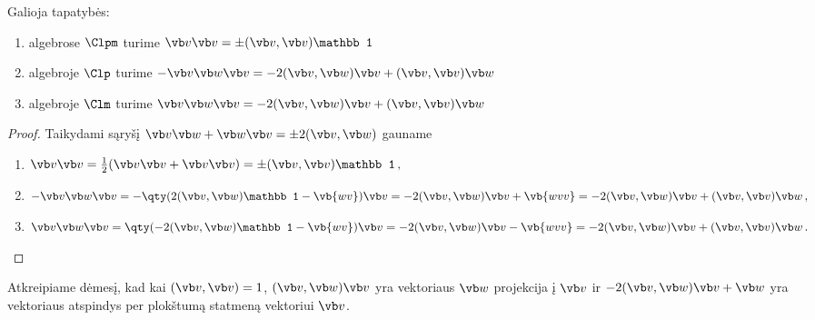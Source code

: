 \begin{proposition}
	\label{prop:R_action}
	Galioja tapatybės:
	\begin{enumerate}
		\item[$(i)$] algebrose $\Clpm$ turime $ \vb v \vb v = \pm(\vb v,\vb v) \mathbb 1$
		\item[$(ii)$] algebroje $\Clp$ turime $ -\vb v \vb w \vb v = -2(\vb v,\vb w) \vb v + (\vb v,\vb v)\vb w $
		\item[$(iii)$] algebroje $\Clm$ turime $ \vb v \vb w \vb v = -2(\vb v,\vb w) \vb v + (\vb v,\vb v)\vb w $
	\end{enumerate}
\end{proposition}
\begin{proof} Taikydami sąryšį $\vb v \vb w + \vb w \vb v = \pm2(\vb v ,\vb w)$ gauname
	\begin{enumerate}
		\item[$(i)$] 
			$
			\vb v \vb v 
			= \frac{1}{2}(\vb v \vb v + \vb v \vb v) 
			= \pm(\vb v,\vb v) \mathbb 1
			\,,
			$
		\item[$(ii)$] 	
			$
			-\vb v \vb w \vb v 
			= -\qty( 2(\vb v,\vb w)\mathbb 1 - \vb{wv} )\vb v 
			= -2(\vb v,\vb w) \vb v + \vb{wvv} 
			= -2(\vb v,\vb w) \vb v + (\vb v,\vb v)\vb w 
			\,,
			$
		\item[$(iii)$]
			$
			\vb v \vb w \vb v 
			= \qty( - 2(\vb v,\vb w)\mathbb 1 - \vb{wv} )\vb v 
			= -2(\vb v,\vb w) \vb v - \vb{wvv} 
			= -2(\vb v,\vb w) \vb v + (\vb v,\vb v)\vb w 
			\,.
			$
			\qedhere
	\end{enumerate}
\end{proof}

\begin{remark}
	Atkreipiame dėmesį, kad kai $(\vb v,\vb v)=1$,
	$(\vb v,\vb w)\vb v$ yra vektoriaus $\vb w$ projekcija į $\vb v$
	ir $-2(\vb v,\vb w)\vb v + \vb w$ yra vektoriaus atspindys
	per plokštumą statmeną vektoriui $\vb v$. 
\end{remark}

